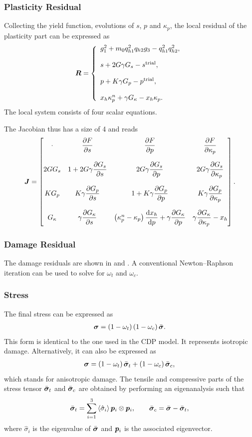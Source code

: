 \subsubsection{Plasticity Residual}
Collecting the yield function, evolutions of $s$, $p$ and $\kappa_p$, the local residual of the plasticity part can be expressed as
\begin{gather}
\bm{R}=\left\{
\begin{array}{l}
g_1^2+m_0q^2_{h1}q_{h2}g_3-q^2_{h1}q^2_{h2},\\[4mm]
s+2G\gamma{}G_s-s^\text{trial},\\[4mm]
p+K\gamma{}G_p-p^\text{trial},\\[4mm]
x_h\kappa_p^n+\gamma{}G_\kappa-x_h\kappa_p.
\end{array}
\right.
\end{gather}
The local system consists of four scalar equations.

The Jacobian thus has a size of \num{4} and reads
\begin{gather}
\bm{J}=\begin{bmatrix}
\cdot&\dfrac{\partial{F}}{\partial{s}}&\dfrac{\partial{F}}{\partial{p}}&\dfrac{\partial{F}}{\partial{\kappa_p}}\\[6mm]
2GG_s&1+2G\gamma\dfrac{\partial{G_s}}{\partial{s}}&2G\gamma\dfrac{\partial{G_s}}{\partial{p}}&2G\gamma\dfrac{\partial{G_s}}{\partial{\kappa_p}}\\[6mm]
KG_p&K\gamma\dfrac{\partial{G_p}}{\partial{s}}&1+K\gamma\dfrac{\partial{G_p}}{\partial{p}}&K\gamma\dfrac{\partial{G_p}}{\partial{\kappa_p}}\\[6mm]
G_\kappa&\gamma\dfrac{\partial{G_\kappa}}{\partial{s}}&\left(\kappa_p^n-\kappa_p\right)\dfrac{\mathrm{d}x_h}{\mathrm{d}p}+\gamma\dfrac{\partial{G_\kappa}}{\partial{p}}&\gamma\dfrac{\partial{G_\kappa}}{\partial{\kappa_p}}-x_h
\end{bmatrix}.
\end{gather}
\subsubsection{Damage Residual}
The damage residuals are shown in  and .
A conventional Newton--Raphson iteration can be used to solve for $\omega_t$ and $\omega_c$.
\subsubsection{Stress}
The final stress can be expressed as
\begin{gather}
\bm{\sigma}=\left(1-\omega_t\right)\left(1-\omega_c\right)\bar{\bm{\sigma}}.
\end{gather}
This form is identical to the one used in the CDP model.
It represents isotropic damage.
Alternatively, it can also be expressed as
\begin{gather}\label{eq:aniso_damage}
\bm{\sigma}=\left(1-\omega_t\right)\bar{\bm{\sigma}}_t+\left(1-\omega_c\right)\bar{\bm{\sigma}}_c,
\end{gather}
which stands for anisotropic damage.
The tensile and compressive parts of the stress tensor $\bar{\bm{\sigma}}_t$ and $\bar{\bm{\sigma}}_c$ are obtained by performing an eigenanalysis such that
\begin{gather}
\bar{\bm{\sigma}}_t=\sum_{i=1}^3\left\langle\hat{\sigma}_i\right\rangle\bm{p}_i\otimes\bm{p}_i,\qquad\bar{\bm{\sigma}}_c=\bar{\bm{\sigma}}-\bar{\bm{\sigma}}_t,
\end{gather}
where $\hat{\sigma}_i$ is the eigenvalue of $\bar{\bm{\sigma}}$ and $\bm{p}_i$ is the associated eigenvector.

